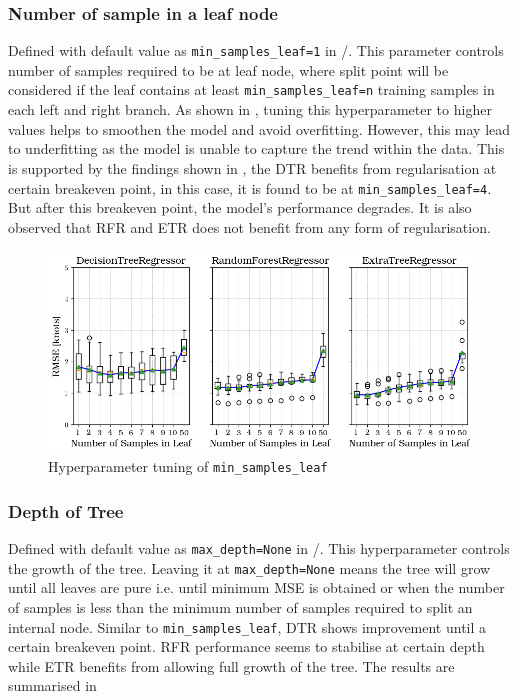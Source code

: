 \subsubsection*{Number of sample in a leaf node}\label{sec:min_samples_leaf}

Defined with default value as {\tt min\_samples\_leaf=1} in \scikit/. This parameter controls number of samples required to be at leaf node, where split point will be considered if the leaf contains at least {\tt min\_samples\_leaf=n} training samples in each left and right branch. As shown in , tuning this hyperparameter to higher values helps to smoothen the model and avoid overfitting. However, this may lead to underfitting as the model is unable to capture the trend within the data. This is supported by the findings shown in , the DTR benefits from regularisation at certain breakeven point, in this case, it is found to be at {\tt min\_samples\_leaf=4}. But after this breakeven point, the model's performance degrades. It is also observed that RFR and ETR does not benefit from any form of regularisation.  

\begin{figure}[h]
    \centering
        \includegraphics[width=.85\textwidth]{02_figures/hpo_min_samples_leaf.png}
        \caption{Hyperparameter tuning of {\tt min\_samples\_leaf}}
        \label{fig:hpo_min_samples_leaf}
\end{figure}

\subsubsection*{Depth of Tree}\label{sec:max_depth}

Defined with default value as {\tt max\_depth=None} in \scikit/. This hyperparameter controls the growth of the tree. Leaving it at {\tt max\_depth=None} means the tree will grow until all leaves are pure i.e. until minimum MSE is obtained or when the number of samples is less than the minimum number of samples required to split an internal node. Similar to {\tt min\_samples\_leaf}, DTR shows improvement until a certain breakeven point. RFR performance seems to stabilise at certain depth while ETR benefits from allowing full growth of the tree. The results are summarised in   

